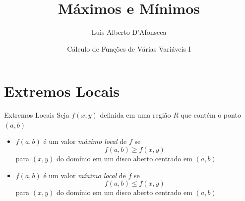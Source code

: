 
\usepackage{apresentacao}
\usepackage{mathconfig}
\usepackage{tabto}


\setcounter{exemplo}{0}

\makeatletter
\graphicspath  {{./figs/}}
\makeatother

\newcommand{\D}[2]{\dfrac{\partial {#1}}{\partial {#2}}}
\newcommand{\DS}[2]{\frac{\partial^2 {#1}}{\partial {#2}^2}}
\newcommand{\DM}[3]{\frac{\partial^2 {#1}}{\partial {#2} \partial {#3}}}

\newcommand{\vetor}[2]{\left(\begin{array}{c} #1 \\ #2 \end{array}\right)}

\newcommand{\veci}{\bm{i}}
\newcommand{\vecj}{\bm{j}}
\newcommand{\veck}{\bm{k}}

\title {Máximos e Mínimos}
\author{\large Luis Alberto D'Afonseca}
\date  {Cálculo de Funções de Várias Variáveis I}



\begin{frame}
    \titlepage
\end{frame}

\section{Extremos Locais}


\begin{frame}{Extremos Locais}
  Seja $f(x, y)$ definida em uma região $R$ que contém o ponto $(a, b)$

  \pause
  \begin{itemize}[<+->]
    \item \(f(a, b)\) é um valor \emph{máximo local} de $f$ se
          \[
            f(a, b) \geq f(x, y)
          \]
          para \((x, y)\) do domínio em um disco aberto centrado em \((a, b)\)
    \item \(f(a, b)\) é um valor \emph{mínimo local} de $f$ se
          \[
            f(a, b) \leq f(x, y)
          \]
          para \((x, y)\) do domínio em um disco aberto centrado em \((a, b)\)
  \end{itemize}
\end{frame}

